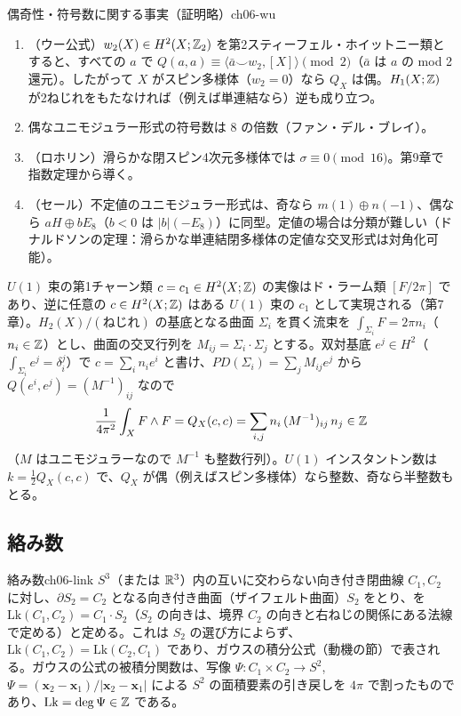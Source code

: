 \begin{mythm}{偶奇性・符号数に関する事実（証明略）}{ch06-wu}
\begin{enumerate}
\item（ウー公式）$w_2(X)\in H^2(X;\mathbb{Z}_2)$ を第2スティーフェル・ホイットニー類とすると、すべての $a$ で $Q(a,a)\equiv\langle\bar a\smile w_2,[X]\rangle\pmod2$（$\bar a$ は $a$ の mod 2 還元）。したがって $X$ がスピン多様体（$w_2=0$）なら $Q_X$ は偶。$H_1(X;\mathbb{Z})$ が2ねじれをもたなければ（例えば単連結なら）逆も成り立つ。
\item 偶なユニモジュラー形式の符号数は $8$ の倍数（ファン・デル・ブレイ）。
\item（ロホリン）滑らかな閉スピン4次元多様体では $\sigma\equiv0\pmod{16}$。第9章で指数定理から導く。
\item（セール）不定値のユニモジュラー形式は、奇なら $m(1)\oplus n(-1)$、偶なら $aH\oplus b E_8$（$b<0$ は $\lvert b\rvert(-E_8)$）に同型。定値の場合は分類が難しい（ドナルドソンの定理：滑らかな単連結閉多様体の定値な交叉形式は対角化可能）。
\end{enumerate}
\end{mythm}

\begin{physbox}[：$U(1)$ 流束とインスタントン数]
$U(1)$ 束の第1チャーン類 $c=c_1\in H^2(X;\mathbb{Z})$ の実像はド・ラーム類 $[F/2\pi]$ であり、逆に任意の $c\in H^2(X;\mathbb{Z})$ はある $U(1)$ 束の $c_1$ として実現される（第7章）。$H_2(X)/(\text{ねじれ})$ の基底となる曲面 $\Sigma_i$ を貫く流束を $\int_{\Sigma_i}F=2\pi n_i$（$n_i\in\mathbb{Z}$）とし、曲面の交叉行列を $M_{ij}=\Sigma_i\cdot\Sigma_j$ とする。双対基底 $e^j\in H^2$（$\int_{\Sigma_i}e^j=\delta_i^j$）で $c=\sum_in_ie^i$ と書け、$PD(\Sigma_i)=\sum_jM_{ij}e^j$ から $Q(e^i,e^j)=(M^{-1})_{ij}$ なので
\[
\frac{1}{4\pi^2}\int_XF\wedge F=Q_X(c,c)=\sum_{i,j}n_i\,(M^{-1})_{ij}\,n_j\in\mathbb{Z}
\]
（$M$ はユニモジュラーなので $M^{-1}$ も整数行列）。$U(1)$ インスタントン数は $k=\tfrac12Q_X(c,c)$ で、$Q_X$ が偶（例えばスピン多様体）なら整数、奇なら半整数もとる。
\end{physbox}

\subsection{絡み数}

\begin{mydef}{絡み数}{ch06-link}
$S^3$（または $\mathbb{R}^3$）内の互いに交わらない向き付き閉曲線 $C_1,C_2$ に対し、$\partial S_2=C_2$ となる向き付き曲面（ザイフェルト曲面）$S_2$ をとり、を $\mathrm{Lk}(C_1,C_2)=C_1\cdot S_2$（$S_2$ の向きは、境界 $C_2$ の向きと右ねじの関係にある法線で定める）と定める。これは $S_2$ の選び方によらず、$\mathrm{Lk}(C_1,C_2)=\mathrm{Lk}(C_2,C_1)$ であり、ガウスの積分公式（動機の節）で表される。ガウスの公式の被積分関数は、写像 $\Psi\colon C_1\times C_2\to S^2$, $\Psi=(\bm x_2-\bm x_1)/\lvert\bm x_2-\bm x_1\rvert$ による $S^2$ の面積要素の引き戻しを $4\pi$ で割ったものであり、$\mathrm{Lk}=\deg\Psi\in\mathbb{Z}$ である。
\end{mydef}

